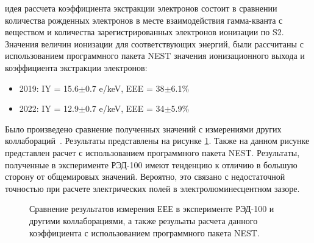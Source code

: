 идея рассчета коэффициента экстракции электронов состоит в сравнении количества рожденных электронов в месте взаимодействия гамма-кванта с веществом и количества зарегистрированных электронов ионизации по S2. 
Значения величин ионизации для соответствующих энергий, были рассчитаны с использованием программного пакета NEST %
 значения ионизационного выхода и коэффициента экстракции электронов:
\begin{itemize}
    \item 2019: IY = 15.6$\pm$0.7 e/keV, EEE = 38$\pm$6.1\%
    \item 2022: IY = 12.9$\pm$0.7 e/keV, EEE = 34$\pm$5.9\%
\end{itemize}

Было произведено сравнение полученных значений с измерениями других коллабораций~\cite{Gouschin1978,AprileEEE_2014,Edwards_2018,PhysRevD.99.103024}. Результаты представлены на рисунке \ref{img:EEEworld}. Также на данном рисунке представлен расчет с использованием программного пакета NEST. Результаты, полученные в эксперименте РЭД-100 имеют тенденцию к отличию в большую сторону от общемировых значений. Вероятно, это связано с недостаточной точностью при расчете электрических полей в электролюминесцентном зазоре.

\begin{figure}[H]
  \caption{Сравнение результатов измерения ЕЕЕ в эксперименте РЭД-100 и другими коллаборациями, а также резульаты расчета данного коэффициента с использованием программного пакета NEST.}
  \label{img:EEEworld}  
\end{figure}